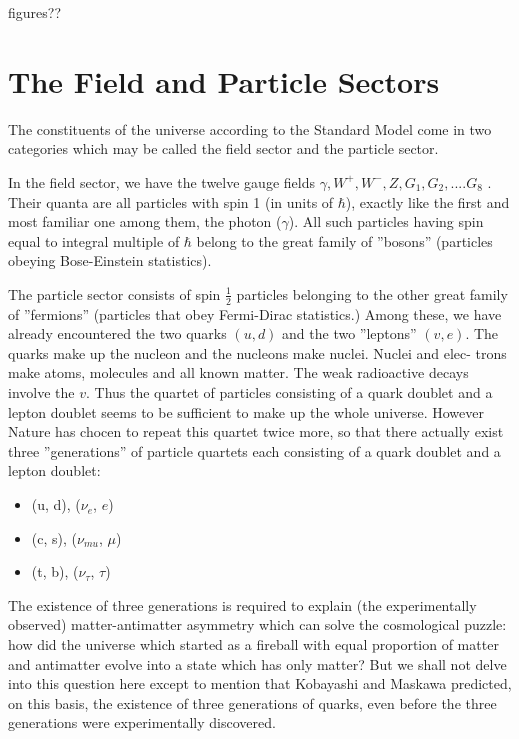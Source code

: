 figures??

\section*{The Field and Particle Sectors}

The constituents of the universe according to the Standard Model come in two
categories which may be called the field sector and the particle sector.


In the field sector, we have the twelve gauge fields $\gamma, W^{+} , W^{-}, Z,$\break $ G_{1} ,
G_{2} ,....G_{8}$ . Their quanta are all particles with spin 1 (in units of $\hbar$), exactly like
the first and most familiar one among them, the photon ($\gamma$). All such particles
having spin equal to integral multiple of $\hbar$ belong to the great family of ”bosons”
(particles obeying Bose-Einstein statistics).

The particle sector consists of spin $\frac{1}{2}$ particles belonging to the other great
family of ”fermions” (particles that obey Fermi-Dirac statistics.) Among these,
we have already encountered the two quarks $(u,d)$ and the two ”leptons” $(v,e)$.
The quarks make up the nucleon and the nucleons make nuclei. Nuclei and elec-
trons make atoms, molecules and all known matter. The weak radioactive decays
involve the $v$. Thus the quartet of particles consisting of a quark doublet and a
lepton doublet seems to be sufficient to make up the whole universe. However
Nature has chocen to repeat this quartet twice more, so that there actually exist
three ”generations” of particle quartets each consisting of a quark doublet and a lepton doublet:
\begin{itemize}
\item (u, d), ($\nu_{e}$, $e$)
\item (c, s), ($\nu_{mu}$, $\mu$)
\item (t, b), ($\nu_{\tau}$, $\tau$)
\end{itemize}

The existence of three generations is required to explain (the experimentally
observed) matter-antimatter asymmetry which can solve the cosmological puzzle:
how did the universe which started as a fireball with equal proportion of matter
and antimatter evolve into a state which has only matter? But we shall not delve
into this question here except to mention that Kobayashi and Maskawa predicted,
on this basis, the existence of three generations of quarks, even before the three
generations were experimentally discovered.



